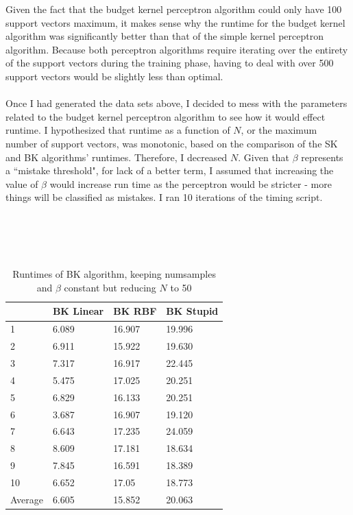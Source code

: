 \documentclass[submit]{harvardml}
\begin{document}
\noindent Given the fact that the budget kernel perceptron algorithm could only have 100 support vectors maximum, it makes sense why the runtime for the budget kernel algorithm was significantly better than that of the simple kernel perceptron algorithm. Because both perceptron algorithms require iterating over the entirety of the support vectors during the training phase, having to deal with over 500 support vectors would be slightly less than optimal. \\ \\ 
Once I had generated the data sets above, I decided to mess with the parameters related to the budget kernel perceptron algorithm to see how it would effect runtime. I hypothesized that runtime as a function of $N$, or the maximum number of support vectors, was monotonic, based on the comparison of the SK and BK algorithms' runtimes. Therefore, I decreased $N$. Given that $\beta$ represents a ``mistake threshold", for lack of a better term, I assumed that increasing the value of $\beta$ would increase run time as the perceptron would be stricter - more things will be classified as mistakes. I ran 10 iterations of the timing script. \\ \\ \\ \\ \\
\begin{table}[hbt]
\centering
\caption{Runtimes of BK algorithm, keeping numsamples and $\beta$ constant but reducing $N$ to 50}
\label{my-label}
\begin{tabular}{l|lll}
        & BK Linear & BK RBF & BK Stupid \\ \hline
1       & 6.089     & 16.907 & 19.996    \\
2       & 6.911     & 15.922 & 19.630    \\
3       & 7.317     & 16.917 & 22.445    \\
4       & 5.475     & 17.025 & 20.251    \\
5       & 6.829     & 16.133 & 20.251    \\
6       & 3.687     & 16.907 & 19.120    \\
7       & 6.643     & 17.235 & 24.059    \\
8       & 8.609     & 17.181 & 18.634    \\
9       & 7.845     & 16.591 & 18.389    \\
10      & 6.652     & 17.05  & 18.773    \\ \hline
Average & 6.605     & 15.852 & 20.063   
\end{tabular}
\end{table}
\end{document}
